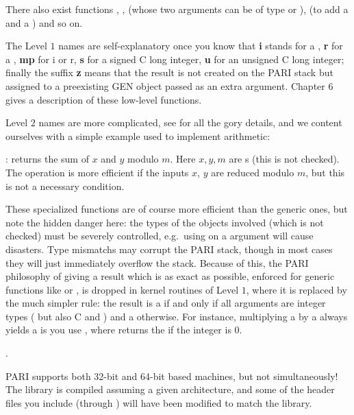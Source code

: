 \noindent
There also exist functions , ,  (whose
two arguments can be of type  or ),  (to add a
 and a ) and so on.

The Level $1$ names are self-explanatory once you know that {\bf i} stands for a
, {\bf r} for a , {\bf mp} for i or r, {\bf s} for a signed C
long integer, {\bf u} for an unsigned C long integer; finally the suffix {\bf z}
means that the result is not created on the PARI stack but assigned to a
preexisting GEN object passed as an extra argument. Chapter 6 gives a description
of these low-level functions.

Level $2$ names are more complicated, see  for all the
gory details, and we content ourselves with a simple example used to implement
 arithmetic:

: returns the sum of $x$ and $y$
modulo $m$. Here $x, y, m$ are s (this is not checked). The operation
is more efficient if the inputs $x$, $y$ are reduced modulo $m$, but this is not a
necessary condition.

 These specialized functions are of course more
efficient than the generic ones, but note the hidden danger here: the types of the
objects involved (which is not checked) must be severely controlled, e.g.~using
 on a  argument will cause disasters. Type mismatchs may
corrupt the PARI stack, though in most cases they will just immediately overflow
the stack. Because of this, the PARI philosophy of giving a result which is as
exact as possible, enforced for generic functions like  or ,
is dropped in kernel routines of Level $1$, where it is replaced by the much
simpler rule: the result is a  if and only if all arguments
are integer types ( but also C  and ) and a
 otherwise. For instance, multiplying a  by a 
always yields a  is you use , where  returns the
  if the integer is $0$.

.

\noindent
PARI supports both 32-bit and 64-bit based machines, but not simultaneously!
The library is compiled assuming a given architecture, and some
of the header files you include (through ) will have been
modified to match the library.

